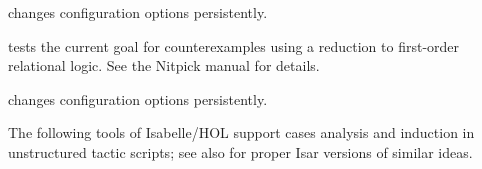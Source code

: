\begin{isabellebody}
\begin{isamarkuptext}
\begin{description}
  \item \hyperlink{command.HOL.refute-params}{\mbox{}} changes \hyperlink{command.HOL.refute}{\mbox{}} configuration options persistently.

  \item \hyperlink{command.HOL.nitpick}{\mbox{}} tests the current goal for
  counterexamples using a reduction to first-order relational
  logic. See the Nitpick manual \cite{isabelle-nitpick} for details.

  \item \hyperlink{command.HOL.nitpick-params}{\mbox{}} changes \hyperlink{command.HOL.nitpick}{\mbox{}} configuration options persistently.

  \end{description}%
\end{isamarkuptext}%
\isamarkuptrue%
%
\isamarkuptrue%
%
\begin{isamarkuptext}%
The following tools of Isabelle/HOL support cases analysis and
  induction in unstructured tactic scripts; see also
   for proper Isar versions of similar ideas.


\end{isamarkuptext}
\end{isabellebody}
